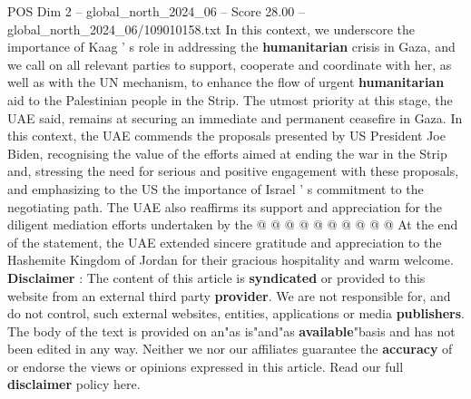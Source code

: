 \begin{textsample}{POS Dim 2 – global\_north\_2024\_06 – Score 28.00 – global\_north\_2024\_06/109010158.txt}
In this context, we underscore the importance of Kaag ' s role in addressing the \textbf{humanitarian} crisis in Gaza, and we call on all relevant parties to support, cooperate and coordinate with her, as well as with the UN mechanism, to enhance the flow of urgent \textbf{humanitarian} aid to the Palestinian people in the Strip.
The utmost priority at this stage, the UAE said, remains at securing an immediate and permanent ceasefire in Gaza.
In this context, the UAE commends the proposals presented by US President Joe Biden, recognising the value of the efforts aimed at ending the war in the Strip and, stressing the need for serious and positive engagement with these proposals, and emphasizing to the US the importance of Israel ' s commitment to the negotiating path.
The UAE also reaffirms its support and appreciation for the diligent mediation efforts undertaken by the @ @ @ @ @ @ @ @ @ @ At the end of the statement, the UAE extended sincere gratitude and appreciation to the Hashemite Kingdom of Jordan for their gracious hospitality and warm welcome. \textbf{Disclaimer} : The content of this article is \textbf{syndicated} or provided to this website from an external third party \textbf{provider}.
We are not responsible for, and do not control, such external websites, entities, applications or media \textbf{publishers}.
The body of the text is provided on an"as is"and"as \textbf{available}"basis and has not been edited in any way.
Neither we nor our affiliates guarantee the \textbf{accuracy} of or endorse the views or opinions expressed in this article.
Read our full \textbf{disclaimer} policy here.

\end{textsample}

